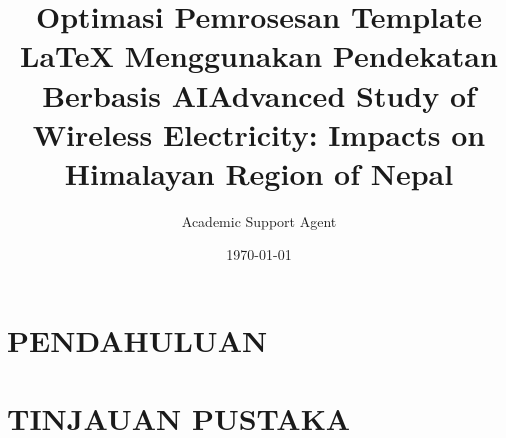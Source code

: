 \documentclass{article}
\title{Optimasi Pemrosesan Template LaTeX Menggunakan Pendekatan Berbasis AI}
\author{Academic Support Agent}
\date{\today}
\begin{document}
\maketitle

\begin{abstract}

\end{abstract}

\chapter{PENDAHULUAN}


\chapter{TINJAUAN PUSTAKA}


\usepackage{amsmath}
\usepackage{graphicx}
\usepackage{geometry}
\usepackage{setspace}
\usepackage{tocloft} %
\usepackage{lipsum}
\usepackage{mathptmx} 
\usepackage[utf8x]{inputenc}
\usepackage{hyperref}
\usepackage{apacite}
\usepackage{colortbl} %
\usepackage{xcolor}   
\usepackage{multicol}
\usepackage{multirow}
\usepackage{booktabs} %
\usepackage{array}    %
\usepackage{tabularx} %
\usepackage{caption}  %
\usepackage{enumitem}
\usepackage{float}

\onehalfspacing
\geometry{margin=1in, a4paper}
\fontsize{14pt}{12pt}\selectfont \title{Advanced Study of Wireless Electricity: Impacts on Himalayan Region of Nepal}
\renewcommand{\arraystretch}{1.5}
\author{}
\date{}
\end{document}
